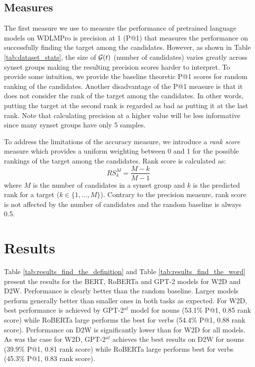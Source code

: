 \documentclass[11pt,a4paper]{article}
\begin{document}
\subsection{Measures}

  
The first measure we use to measure the performance of
pretrained language models on WDLMPro is precision at 1 (P@1) that measures the performance on successfully finding the target among the candidates. 
However, as shown in Table \ref{tab:dataset_stats}, the size of ${\cal G}(t)$ (number of candidates) varies greatly across synset groups making the resulting precision scores harder to interpret. 
To provide some intuition, we provide the baseline theoretic
P@1 scores for random ranking of the candidates. 
Another disadvantage of the P@1 measure is that it does not consider the rank of the target among the candidates. 
In other words, putting the target at the second rank is regarded as bad as putting it at the last rank. Note that calculating precision at a higher value will be less informative since many synset groups have only 5 samples. 

  
To address the limitations of the accuracy measure, we introduce a \textit{rank score} measure which provides a uniform weighting between 0 and 1 for the possible rankings of the target among the candidates. Rank score is calculated as:
\begin{equation*}
    RS^M_k = \frac{M-k}{M-1}
\end{equation*}
where $M$ is the number of candidates in a synset group and $k$ is the predicted rank for a target ($k \in
\{1,...,M\}$). Contrary to the precision measure, rank score is not affected by the number of candidates and the random baseline is always 0.5.  

\section{Results}

Table \ref{tab:results_find_the_definition} and Table
\ref{tab:results_find_the_word} present the results for the
BERT, RoBERTa and GPT-2 models
for W2D and D2W. Performance is clearly better than the
random baseline.
Larger models perform generally better than smaller
ones in both tasks as expected. For W2D,
best performance is achieved by GPT-2$^{xl}$ model for 
nouns (53.1\% P@1, 0.85 rank score) while RoBERTa large
performs the best for  verbs (54.4\% P@1, 0.88 rank
score). Performance on D2W is
significantly lower than for W2D for all
models.  As was the case for W2D, GPT-2$^{xl}$ achieves the
best results on D2W for  nouns (39.9\% P@1, 0.81 rank
score) while RoBERTa large performs best for  verbs
(45.3\% P@1, 0.83 rank score).
\end{document}
